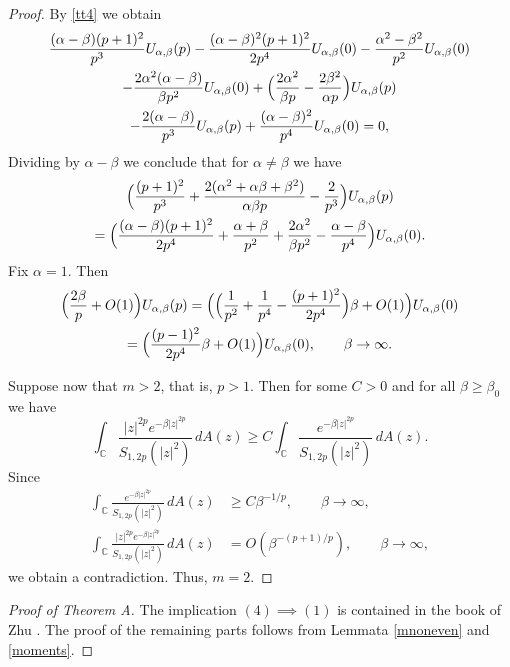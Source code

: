\documentclass[12pt]{amsart}
\numberwithin{equation}{section}
\theoremstyle{plain}
\numberwithin{equation}{section}
\begin{document}
\begin{proof}
By \eqref{tt4} we obtain
\begin{multline*}
\frac{(\alpha-\beta)(p+1)^2}{p^3} U_{\alpha,\beta}(p)-\frac{(\alpha-\beta)^2(p+1)^2}{2p^4}U_{\alpha,\beta}(0)- \frac{\alpha^2-\beta^2}{p^2}U_{\alpha,\beta}(0)\\
-\frac{2\alpha^2(\alpha-\beta)}{\beta p^2}U_{\alpha,\beta}(0)+\Bigl(\frac{2\alpha^2}{\beta p}
-\frac{2\beta^2}{\alpha p}\Bigr)U_{\alpha,\beta}(p)
\\-\frac{2(\alpha-\beta)}{p^3}U_{\alpha,\beta}(p)+\frac{(\alpha-\beta)^2}{p^4}U_{\alpha,\beta}(0)=0,
\end{multline*}
Dividing by $\alpha-\beta$ we conclude that for $\alpha\not=\beta$ we have 
\begin{multline*}
\Bigl(\frac{(p+1)^2}{p^3} +\frac{2(\alpha^2+\alpha\beta+\beta^2)}{\alpha\beta p}-\frac{2}{p^3}\Bigr)U_{\alpha,\beta}(p) 
\\ =\Bigl(\frac{(\alpha-\beta)(p+1)^2}{2p^4}+\frac{\alpha+\beta}{p^2}+\frac{2\alpha^2}{\beta p^2}-\frac{\alpha-\beta}{p^4}\Bigr)U_{\alpha,\beta}(0).
\end{multline*}
Fix $\alpha=1$. Then
\begin{multline*}
\Bigl(\frac{2\beta}{p}+O(1)\Bigr)U_{\alpha,\beta}(p)  =\Bigl(\Bigl(\frac{1}{p^2}+\frac{1}{p^4}-\frac{(p+1)^2}{2p^4}\Bigr)\beta+O(1)\Bigr)U_{\alpha,\beta}(0)\\=
\Bigl(\frac{(p-1)^2}{2p^4}\beta+O(1)\Bigr)U_{\alpha,\beta}(0),\qquad \beta\to\infty.
\end{multline*}

Suppose now that $m>2$, that is, $p>1$. Then for some $C>0$ and for all $\beta\ge \beta_0$ we have 
$$
\int_{\mathbb C}  \frac{  |z|^{2p} e^{-  \beta |z|^{2p}}  }{ S_{1,2p}(|z|^2)}\,dA(z)\ge C \int_{\mathbb C}  \frac{e^{-  \beta |z|^{2p}}  }{ S_{1,2p}(|z|^2)}\,dA(z).
$$
Since
\begin{align*}
\int_{\mathbb C}  \frac{e^{-  \beta |z|^{2p}}  }{ S_{1,2p}(|z|^2)}\,dA(z)&\ge C\beta^{-1/p},\qquad \beta\to\infty,\\
\int_{\mathbb C}  \frac{|z|^{2p} e^{-  \beta |z|^{2p}}  }{ S_{1,2p}(|z|^2)}\,dA(z)&=O(\beta^{-(p+1)/p}),\qquad \beta\to\infty,
\end{align*}
we obtain a contradiction. Thus, $m=2$. 
\end{proof}


 

\begin{proof}[Proof of Theorem A] The implication $(4)\implies(1)$ is contained in the book of Zhu \cite[Section 3.2]{Z}.
The proof of the remaining parts follows from Lemmata \ref{mnoneven} and \ref{moments}.
\end{proof}
\end{document}
